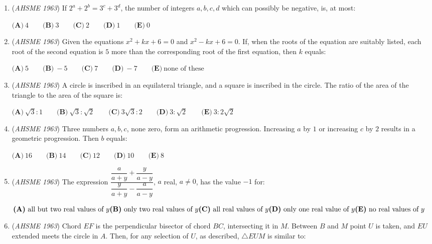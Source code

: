 \begin{enumerate}
	\item (\textit{AHSME 1963}) If $2^a+2^b=3^c+3^d$, the number of integers $a,b,c,d$ which can possibly be negative, is, at most:


 $\textbf{(A)}\ 4 \qquad \textbf{(B)}\ 3 \qquad \textbf{(C)}\ 2 \qquad \textbf{(D)}\ 1 \qquad \textbf{(E)}\ 0$


	\item (\textit{AHSME 1963}) Given the equations $x^2+kx+6=0$ and $x^2-kx+6=0$. If, when the roots of the equation are suitably listed, 
each root of the second equation is $5$ more than the corresponding root of the first equation, then $k$ equals:


 $\textbf{(A)}\ 5 \qquad \textbf{(B)}\ -5 \qquad \textbf{(C)}\ 7 \qquad \textbf{(D)}\ -7 \qquad \textbf{(E)}\ \text{none of these}$


	\item (\textit{AHSME 1963}) A circle is inscribed in an equilateral triangle, and a square is inscribed in the circle. 
The ratio of the area of the triangle to the area of the square is:


 $\textbf{(A)}\ \sqrt{3}:1\qquad \textbf{(B)}\ \sqrt{3}:\sqrt{2}\qquad \textbf{(C)}\ 3\sqrt{3}:2\qquad \textbf{(D)}\ 3:\sqrt{2}\qquad \textbf{(E)}\ 3:2\sqrt{2}$


	\item (\textit{AHSME 1963}) Three numbers $a,b,c$, none zero, form an arithmetic progression. Increasing $a$ by $1$ or increasing $c$ by $2$ results 
in a geometric progression. Then $b$ equals:


 $\textbf{(A)}\ 16 \qquad \textbf{(B)}\ 14 \qquad \textbf{(C)}\ 12 \qquad \textbf{(D)}\ 10 \qquad \textbf{(E)}\ 8$


	\item (\textit{AHSME 1963}) The expression $\dfrac{\dfrac{a}{a+y}+\dfrac{y}{a-y}}{\dfrac{y}{a+y}-\dfrac{a}{a-y}}$, $a$ real, $a\neq 0$, has the value $-1$ for:


 $\textbf{(A)}\ \text{all but two real values of }y \qquad \\ \textbf{(B)}\ \text{only two real values of }y \qquad \\ \textbf{(C)}\ \text{all real values of }y\qquad \\ \textbf{(D)}\ \text{only one real value of }y\qquad \\ \textbf{(E)}\ \text{no real values of }y$


	\item (\textit{AHSME 1963}) Chord $EF$ is the perpendicular bisector of chord $BC$, intersecting it in $M$. 
Between $B$ and $M$ point $U$ is taken, 
and $EU$ extended meets the circle in $A$. Then, for any selection of $U$, as described, $\triangle EUM$ is similar to:



\end{enumerate}
